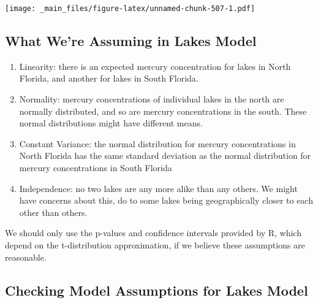 \documentclass[]{book}
\begin{document}
\texttt{[image: \_main\_files/figure-latex/unnamed-chunk-507-1.pdf]}

\subsection{What We're Assuming in Lakes
Model}\label{what-were-assuming-in-lakes-model}

\begin{enumerate}
\def\labelenumi{\arabic{enumi}.}
\item
  Linearity: there is an expected mercury concentration for lakes in
  North Florida, and another for lakes in South Florida.
\item
  Normality: mercury concentrations of individual lakes in the north are
  normally distributed, and so are mercury concentrations in the south.
  These normal distributions might have different means.
\item
  Constant Variance: the normal distribution for mercury concentrations
  in North Florida has the same standard deviation as the normal
  distribution for mercury concentrations in South Florida
\item
  Independence: no two lakes are any more alike than any others. We
  might have concerns about this, do to some lakes being geographically
  closer to each other than others.
\end{enumerate}

We should only use the p-values and confidence intervals provided by R,
which depend on the t-distribution approximation, if we believe these
assumptions are reasonable.

\subsection{Checking Model Assumptions for Lakes
Model}\label{checking-model-assumptions-for-lakes-model}
\end{document}
